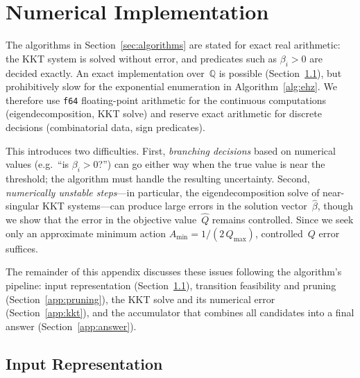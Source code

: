 %
%
%

\section{Numerical Implementation}\label{app:numerical}


The algorithms in Section~\ref{sec:algorithms} are stated for exact
real arithmetic: the KKT system is solved without error, and
predicates such as $\beta_i > 0$ are decided exactly.
An exact implementation over~$\mathbb{Q}$ is possible
(Section~\ref{app:input}), but prohibitively slow for the
exponential enumeration in Algorithm~\ref{alg:ehz}.
We therefore use \texttt{f64} floating-point arithmetic for the
continuous computations (eigendecomposition, KKT solve) and reserve exact
arithmetic for discrete decisions (combinatorial data,
sign predicates).

This introduces two difficulties.
First, \emph{branching decisions} based on numerical values
(e.g.\ ``is $\beta_i > 0$?'') can go either way when the true
value is near the threshold; the algorithm must handle
the resulting uncertainty.
Second, \emph{numerically unstable steps}---in particular,
the eigendecomposition solve of near-singular KKT systems---can
produce large errors in the solution vector~$\hat\beta$, though
we show that the error in the objective value~$\hat Q$ remains
controlled.
Since we seek only an approximate minimum action
$A_{\min} = 1/(2\,Q_{\max})$, controlled~$Q$ error suffices.

The remainder of this appendix discusses these issues following
the algorithm's pipeline: input representation
(Section~\ref{app:input}), transition feasibility and pruning
(Section~\ref{app:pruning}), the KKT solve and its numerical
error (Section~\ref{app:kkt}), and the accumulator that
combines all candidates into a final answer
(Section~\ref{app:answer}).


\subsection{Input Representation}\label{app:input}

